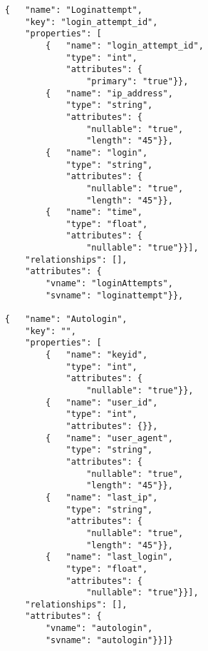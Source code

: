 \documentclass{article}
\begin{document}
\begin{lstlisting}
	{	"name": "Loginattempt",
		"key": "login_attempt_id",
		"properties": [
			{	"name": "login_attempt_id",
				"type": "int",
				"attributes": {
					"primary": "true"}},
			{	"name": "ip_address",
				"type": "string",
				"attributes": {
					"nullable": "true",
					"length": "45"}},
			{	"name": "login",
				"type": "string",
				"attributes": {
					"nullable": "true",
					"length": "45"}},
			{	"name": "time",
				"type": "float",
				"attributes": {
					"nullable": "true"}}],
		"relationships": [],
		"attributes": {
			"vname": "loginAttempts",
			"svname": "loginattempt"}},

	{	"name": "Autologin",
		"key": "",
		"properties": [
			{	"name": "keyid",
				"type": "int",
				"attributes": {
					"nullable": "true"}},
			{	"name": "user_id",
				"type": "int",
				"attributes": {}},
			{	"name": "user_agent",
				"type": "string",
				"attributes": {
					"nullable": "true",
					"length": "45"}},
			{	"name": "last_ip",
				"type": "string",
				"attributes": {
					"nullable": "true",
					"length": "45"}},
			{	"name": "last_login",
				"type": "float",
				"attributes": {
					"nullable": "true"}}],
		"relationships": [],
		"attributes": {
			"vname": "autologin",
			"svname": "autologin"}}]}
\end{lstlisting}
\end{document}
